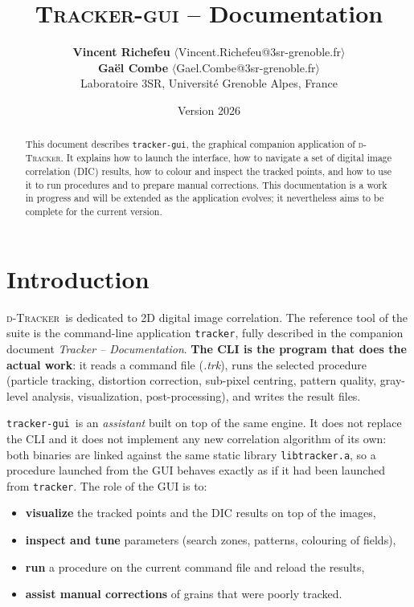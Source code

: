 \documentclass{simpledoc}
\title{\textsc{Tracker-gui} -- Documentation}
\author{
\textbf{Vincent Richefeu} $\langle$Vincent.Richefeu@3sr-grenoble.fr$\rangle$\\
\textbf{Ga\"{e}l Combe} $\langle$Gael.Combe@3sr-grenoble.fr$\rangle$\\
Laboratoire 3SR, Universit\'{e} Grenoble Alpes, France
}
\date{Version 2026}
\newcommand{\soft}{\textsc{d-Tracker}}
\newcommand{\gui}{\screen{tracker-gui}}
\newcommand{\cli}{\screen{tracker}}
\newcommand{\file}[1]{\textit{\color{myblue}#1}}
\newcommand{\screen}[1]{\texttt{\color{myblue}#1}}
\begin{document}
\maketitle

\begin{abstract}
This document describes \gui, the graphical companion application of \soft.
It explains how to launch the interface, how to navigate a set of digital image correlation (DIC)
results, how to colour and inspect the tracked points, and how to use it to run procedures and to
prepare manual corrections.
This documentation is a work in progress and will be extended as the application evolves; it
nevertheless aims to be complete for the current version.
\end{abstract}

\tableofcontents

\newpage

\section{Introduction}

\soft\ is dedicated to 2D digital image correlation. The reference tool of the suite is the
command-line application \cli, fully described in the companion document \emph{Tracker --
Documentation}. \textbf{The CLI is the program that does the actual work}: it reads a command file
(\file{.trk}), runs the selected procedure (particle tracking, distortion correction, sub-pixel
centring, pattern quality, gray-level analysis, visualization, post-processing), and writes the
result files.

\gui\ is an \emph{assistant} built on top of the same engine. It does not replace the CLI and it does
not implement any new correlation algorithm of its own: both binaries are linked against the same
static library \screen{libtracker.a}, so a procedure launched from the GUI behaves exactly as if it
had been launched from \cli. The role of the GUI is to:

\begin{itemize}
  \item \textbf{visualize} the tracked points and the DIC results on top of the images,
  \item \textbf{inspect and tune} parameters (search zones, patterns, colouring of fields),
  \item \textbf{run} a procedure on the current command file and reload the results,
  \item \textbf{assist manual corrections} of grains that were poorly tracked.
\end{itemize}
\end{document}
